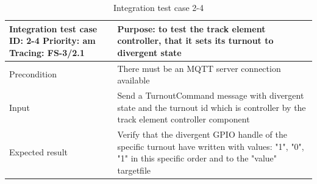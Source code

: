 \begin{table}[H]
	\caption{Integration test case 2-4}
	\label{table:TCase-FSI2-4}
	\begin{center}
		\renewcommand{\arraystretch}{1.8}
		\begin{tabu} 
			to 0.9 \textwidth
			{  X[0.4, c] X[c] }
			\toprule
			Integration test case ID: 2-4 \newline Priority: am \newline Tracing: FS-3/2.1 & Purpose: to test the track element controller, that it sets its turnout to divergent state                                                                 \\ \midrule
			Precondition                                                                   & There must be an MQTT server connection available                                                                                                          \\
			Input                                                                          & Send a TurnoutCommand message with divergent state and the turnout id which is controller by the track element controller component                        \\
			Expected result                                                                & Verify that the divergent GPIO handle of the specific turnout have written with values: "1", "0", "1" in this specific order and to the "value" targetfile \\ \bottomrule
		\end{tabu}
	\end{center}
\end{table} 


